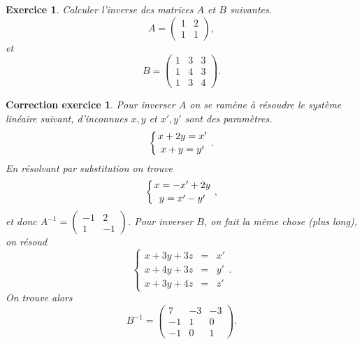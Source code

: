 \documentclass[12pt]{article}
\newtheorem{exercice}{\bf Exercice}
\newtheorem{correction}{\bf Correction exercice}
\newenvironment{exo}{
\begin{exercice}\smallskip\normalfont}{\end{exercice}
}
\newenvironment{cor}{
\begin{correction}\smallskip\normalfont}{\end{correction}
}
\newif\ifcorrige\corrigetrue
\begin{document}
\begin{exo}
Calculer l'inverse des matrices $A$ et $B$ suivantes.
 $$A=\left ( \begin{array}{cc} 1&2\\1&1   \end{array}     \right),$$
 et
 $$B=\left ( \begin{array}{ccc} 1&3&3\\1&4&3\\ 1&3&4  \end{array}     \right).$$
 
\end{exo}
\ifcorrige
\color{magenta}
\begin{cor} Pour inverser $A$ on se ram\`ene \`a r\'esoudre le syst\`eme lin\'eaire suivant, d'inconnues $x,y$ et $x',y'$ sont des param\`etres.
$$\left \{ x+2y=x' \atop x+y=y' \right. .$$
En r\'esolvant par substitution on trouve 
$$\left \{ x=-x'+2y \atop y=x'-y' \right. ,$$
et donc $A^{-1}=\left ( \begin{array}{cc} -1&2\\1&-1   \end{array}     \right)$. Pour inverser $B$, on fait la m\^eme chose (plus long), on r\'esoud
$$\left \{ \begin{array}{ccc}x+3y+3z&=&x'\\ x+4y+3z&=&y'\\ x+3y+4z&=&z' \end{array} \right. .$$
On trouve alors
$$ B^{-1}=\left ( \begin{array}{ccc} 7&-3&-3\\-1&1&0\\ -1&0&1  \end{array}     \right).$$
  $\qquad$   
    \end{cor}
\color{black}
\fi
\end{document}
